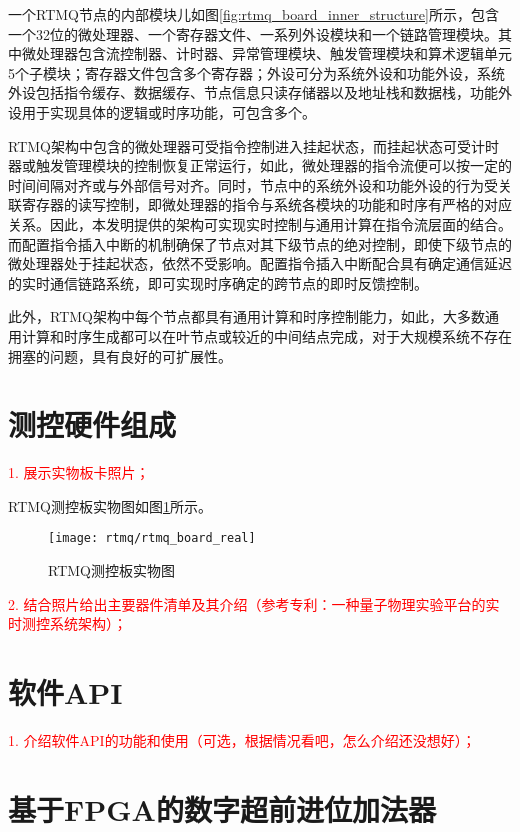一个RTMQ节点的内部模块儿如图\ref{fig:rtmq_board_inner_structure}所示，包含一个32位的微处理器、一个寄存器文件、一系列外设模块和一个链路管理模块。其中微处理器包含流控制器、计时器、异常管理模块、触发管理模块和算术逻辑单元5个子模块；寄存器文件包含多个寄存器；外设可分为系统外设和功能外设，系统外设包括指令缓存、数据缓存、节点信息只读存储器以及地址栈和数据栈，功能外设用于实现具体的逻辑或时序功能，可包含多个。

RTMQ架构中包含的微处理器可受指令控制进入挂起状态，而挂起状态可受计时器或触发管理模块的控制恢复正常运行，如此，微处理器的指令流便可以按一定的时间间隔对齐或与外部信号对齐。同时，节点中的系统外设和功能外设的行为受关联寄存器的读写控制，即微处理器的指令与系统各模块的功能和时序有严格的对应关系。因此，本发明提供的架构可实现实时控制与通用计算在指令流层面的结合。
而配置指令插入中断的机制确保了节点对其下级节点的绝对控制，即使下级节点的微处理器处于挂起状态，依然不受影响。配置指令插入中断配合具有确定通信延迟的实时通信链路系统，即可实现时序确定的跨节点的即时反馈控制。

此外，RTMQ架构中每个节点都具有通用计算和时序控制能力，如此，大多数通用计算和时序生成都可以在叶节点或较近的中间结点完成，对于大规模系统不存在拥塞的问题，具有良好的可扩展性。


\section[测控硬件组成]{测控硬件组成}
\textcolor{red}{
1. 展示实物板卡照片；}

RTMQ测控板实物图如图\ref{fig:rtmq_board_real}所示。
\begin{figure}
    \centering
    \caption[RTMQ测控板实物图]{RTMQ测控板实物图\label{fig:rtmq_board_real}}
    \texttt{[image: rtmq/rtmq\_board\_real]}
\end{figure}

\textcolor{red}{
2. 结合照片给出主要器件清单及其介绍（参考专利：一种量子物理实验平台的实时测控系统架构）；}



\section[软件API]{软件API}
\textcolor{red}{
1. 介绍软件API的功能和使用（可选，根据情况看吧，怎么介绍还没想好）；}


\section[基于FPGA的数字超前进位加法器]{基于FPGA的数字超前进位加法器}

